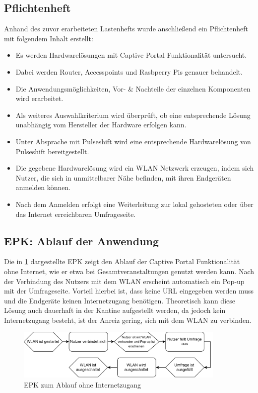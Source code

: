 \subsection{Pflichtenheft}
Anhand des zuvor erarbeiteten Lastenhefts wurde anschließend ein Pflichtenheft mit folgendem Inhalt erstellt:
\begin{itemize}
\item Es werden Hardwarelösungen mit Captive Portal Funktionalität untersucht.
\item Dabei werden Router, Accesspoints und Rasbperry Pis genauer behandelt.
\item Die Anwendungsmöglichkeiten, Vor- \& Nachteile der einzelnen Komponenten wird erarbeitet.
\item Als weiteres Auswahlkriterium wird überprüft, ob eine entsprechende Lösung unabhängig vom Hersteller der Hardware erfolgen kann.
\item Unter Absprache mit Pulseshift wird eine entsprechende Hardwarelösung von Pulseshift bereitgestellt.
\item Die gegebene Hardwarelösung wird ein WLAN Netzwerk erzeugen, indem sich Nutzer, die sich in unmittelbarer Nähe befinden, mit ihren Endgeräten anmelden können.
\item Nach dem Anmelden erfolgt eine Weiterleitung zur lokal gehosteten oder über das Internet erreichbaren Umfrageseite.
\end{itemize}



\subsection{EPK: Ablauf der Anwendung}

Die in \ref{fig:captive_epk1} dargestellte EPK zeigt den Ablauf der Captive Portal Funktionalität ohne Internet, wie er etwa bei Gesamtveranstaltungen genutzt werden kann. Nach der Verbindung des Nutzers mit dem WLAN erscheint automatisch ein Pop-up mit der Umfrageseite. Vorteil hierbei ist, dass keine URL eingegeben werden muss und die Endgeräte keinen Internetzugang benötigen. Theoretisch kann diese Lösung auch dauerhaft in der Kantine aufgestellt werden, da jedoch kein Internetzugang besteht, ist der Anreiz gering, sich mit dem WLAN zu verbinden.
\newline
\begin{figure}[H]
\centering
\includegraphics[width=0.9\textwidth]{images/captiveportal_EPK1}
\caption[EPK zum Ablauf ohne Internetzugang]{EPK zum Ablauf ohne Internetzugang}
\label{fig:captive_epk1}
\end{figure}


